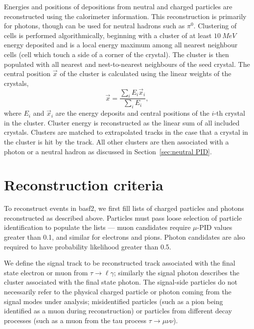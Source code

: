 \documentclass[12pt]{thesis}  %
\begin{document}
Energies and positions of depositions from neutral and charged particles are reconstructed using the calorimeter information. This reconstruction is primarily for photons, though can be used for neutral hadrons such as $\pi^0$. Clustering of cells is performed algorithmically, beginning with a cluster of at least $\SI{10}{MeV}$ energy deposited and is a local energy maximum among all nearest neighbour cells (cell which touch a side of a corner of the crystal). The cluster is then populated with all nearest and nest-to-nearest neighbours of the seed crystal. The central position $\vec{x}$ of the cluster is calculated using the linear weights of the crystals,
\begin{equation}
\vec{x}=\frac{\sum_i E_i \vec{x}_i}{\sum_i E_i},
\end{equation}
where $E_i$ and $\vec{x}_i$ are the energy deposits and central positions of the $i$-th crystal in the cluster. Cluster energy is reconstructed as the linear sum of all included crystals. Clusters are matched to extrapolated tracks in the case that a crystal in the cluster is hit by the track. All other clusters are then associated with a photon or a neutral hadron as discussed in Section~\ref{sec:neutral PID}.


\section{Reconstruction criteria}

To reconstruct events in basf2, we first fill lists of charged particles and photons reconstructed as described above. Particles must pass loose selection of particle identification to populate the lists --- muon candidates require $\mu$-PID values greater than 0.1, and similar for electrons and pions. Photon candidates are also required to have probability likelihood greater than \num{0.5}.

We define the signal track to be reconstructed track associated with the final state electron or muon from $\tau\to\ell\gamma$; similarly the signal photon describes the cluster associated with the final state photon. The signal-side particles do not necessarily refer to the physical charged particle or photon coming from the signal modes under analysis; misidentified particles (such as a pion being identified as a muon during reconstruction) or particles from different decay processes (such as a muon from the tau process $\tau\to\mu\nu\nu$).
\end{document}
